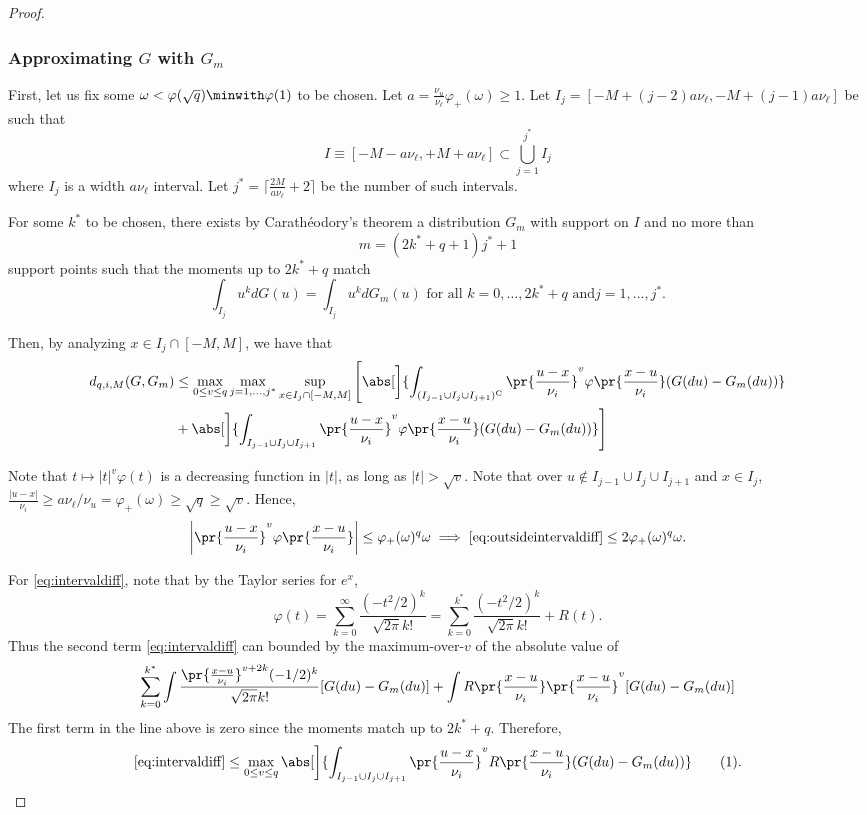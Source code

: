 \documentclass[12pt, reqno]{amsart}
\newcommand\numberthis{\addtocounter{equation}{1}\tag{\theequation}}
\newcommand{\absauto}[1]{\left| #1 \right|}
\newcommand{\invphi}{\varphi_{+}}
\newcommand{\comp}{\mathrm{C}}
\numberwithin{equation}{section}
\begin{document}
\begin{refsection}
\begin{appendices}
\begin{proof}
\subsubsection{Approximating $G$ with $G_m$}

First, let us fix some $\omega < \varphi(\sqrt{q}) \minwith \varphi(1)$ to be chosen.
Let $a = \frac{\nu_u}{\nu_\ell} \invphi(\omega) \ge 1$. Let $I_j = [-M +
(j-2)a\nu_\ell, -M + (j-1) a
\nu_\ell]$ be such that \[
I \equiv [-M - a\nu_\ell, +M + a\nu_\ell] \subset \bigcup_{j=1}^{j^*} I_j
\] where $I_j$ is a width $a\nu_\ell$ interval. Let $j^* = \lceil \frac{2M}
 {a\nu_\ell} + 2\rceil$ be the number of such intervals. 

For some $k^*$ to be chosen, there exists by Carath\'eodory's theorem a distribution $G_m$
with support on $I$ and no
more than \[m = (2k^* + q + 1) j^* + 1\] support points such that the moments up to $2k^*
+ q$ match \[
\int_{I_j} u^k dG(u) = \int_{I_j} u^k dG_m(u) \text{ for all $k = 0,\ldots, 2k^* + q$ and
$j = 1,\ldots, j^*$}.
\]

Then, by analyzing $x \in I_j \cap [-M ,M]$, we have that \begin{align}
d_{q,i,M}(G,G_m) &\le \max_{0 \le v \le q} \max_{j=1,\ldots,j^*}  \sup_{x \in I_j \cap 
[-M,M]} \Bigg [\abs [\bigg]{\int_
{(I_
{j-1}\cup I_j \cup I_
{j+1})^\comp} \pr{\frac{u-x}{\nu_i}}^v \varphi\pr{\frac{x-u}
{\nu_i}} (G(du) - G_m(du))}
\label{eq:outsideintervaldiff}
 \\&+ \abs[\bigg]{ \int_{I_
{j-1}\cup I_j \cup I_
{j+1}} \pr{\frac{u-x}{\nu_i}}^v \varphi\pr{\frac{x-u}
{\nu_i}}  (G(du) - G_m(du)) } \Bigg] \label{eq:intervaldiff}
\end{align}

Note that $
t \mapsto |t|^v \varphi(t)
$
is a decreasing function in $|t|$, as long as $|t| > \sqrt{v}$. Note that over $ u \not
\in I_{j-1} \cup I_j \cup I_{j+1}$ and $x \in I_j$, $
\frac{|u-x|}{\nu_i} \ge a\nu_\ell / \nu_u = \varphi_+(\omega) \ge \sqrt{q} \ge \sqrt{v}
$.
Hence, \[
\absauto{\pr{\frac{u-x}{\nu_i}}^v \varphi\pr{\frac{x-u}
{\nu_i}}} \le \varphi_+(\omega)^{q} \omega \implies  \eqref{eq:outsideintervaldiff} \le
2\varphi_+(\omega)^q \omega. 
\]


For \eqref{eq:intervaldiff}, note that by the Taylor series for $e^x$, \[
\varphi(t) = \sum_{k=0}^\infty \frac{(-t^2/2)^{k}}{\sqrt{2\pi} k!} = \sum_{k=0}^{k^*}
\frac{(-t^2/2)^{k}}{\sqrt{2\pi} k!} + R(t).
\]
Thus the second term \eqref{eq:intervaldiff} can bounded by the maximum-over-$v$ of the
absolute value of \[
\sum_{k=0}^{k^*}\int \frac{\pr{\frac{x-u}{\nu_i}}^{v+2k} (-1/2)^{k}}{
\sqrt{2\pi} k !}
[G(du) - G_m(du)] + \int R\pr{\frac{x-u}
{\nu_i}} \pr{
\frac{x-u}
{\nu_i}}^v [G(du) - G_m(du)]
\]
The first term in the line above is zero since the moments match up to $2k^*+q$.
Therefore,\[
\eqref{eq:intervaldiff} \le \max_{0\le v\le q} \abs[\bigg]{ \int_{I_{j-1}\cup I_j
\cup I_{j+1}} \pr{\frac{u-x}{\nu_i}}^v R\pr{\frac{x-u}{\nu_i}}  (G(du) - G_m(du))
} \numberthis \label{eq:integral_to_bound}.
\]


\end{proof}
\end{appendices}
\end{refsection}
\end{document}
